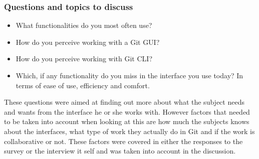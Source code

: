\documentclass[a4paper,oneside]{bth} %
\begin{document}
					\subsubsection*{Questions and topics to discuss}
						\begin{itemize}
							\item What functionalities do you most often use?
							\item How do you perceive working with a Git GUI?
							\item How do you perceive working with Git CLI?
							\item Which, if any functionality do you miss in the interface you use today? In terms of ease of use, efficiency and comfort.
						\end{itemize}
						
						These questions were aimed at finding out more about what the subject needs and wants from the interface he or she works with. However factors that needed to be taken into account when looking at this are how much the subjects knows about the interfaces, what type of work they actually do in Git and if the work is collaborative or not. These factors were covered in either the responses to the survey or the interview it self and was taken into account in the discussion.
\end{document}
